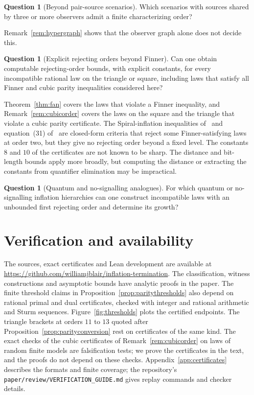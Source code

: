 \documentclass[11pt]{article}
\theoremstyle{plain}
\theoremstyle{definition}
\newtheorem{question}[theorem]{Question}
\newcommand{\repourl}{https://github.com/williamjblair/inflation-termination}
\newcommand{\repo}{\url{\repourl}}
\begin{document}
\begin{question}[Beyond pair-source scenarios]\label{q:hypergraph}
Which scenarios with sources shared by three or more observers admit a finite characterizing order?
\end{question}
Remark~\ref{rem:hypergraph} shows that the observer graph alone does not decide this.

\begin{question}[Explicit rejecting orders beyond Finner]\label{q:effective}
Can one obtain computable rejecting-order bounds, with explicit constants, for every incompatible rational law on the triangle or square, including laws that satisfy all Finner and cubic parity inequalities considered here?
\end{question}
Theorem~\ref{thm:fan} covers the laws that violate a Finner inequality, and Remark~\ref{rem:cubicorder} covers the laws on the square and the triangle that violate a cubic parity certificate. The Spiral-inflation inequalities of~\cite[Section IV C]{WSF2019} and equation~(31) of~\cite{NW2020} are closed-form criteria that reject some Finner-satisfying laws at order two, but they give no rejecting order beyond a fixed level. The constants $8$ and $10$ of the certificates are not known to be sharp. The distance and bit-length bounds apply more broadly, but computing the distance or extracting the constants from quantifier elimination may be impractical.

\begin{question}[Quantum and no-signalling analogues]\label{q:quantum}
For which quantum or no-signalling inflation hierarchies can one construct incompatible laws with an unbounded first rejecting order and determine its growth?
\end{question}

\section{Verification and availability}\label{sec:repro}

The sources, exact certificates and Lean development are available at \repo. The classification, witness constructions and asymptotic bounds have analytic proofs in the paper. The finite threshold claims in Proposition~\ref{prop:paritythresholds} also depend on rational primal and dual certificates, checked with integer and rational arithmetic and Sturm sequences. Figure~\ref{fig:thresholds} plots the certified endpoints. The triangle brackets at orders $11$ to $13$ quoted after Proposition~\ref{prop:parityconversion} rest on certificates of the same kind. The exact checks of the cubic certificates of Remark~\ref{rem:cubicorder} on laws of random finite models are falsification tests; we prove the certificates in the text, and the proofs do not depend on these checks. Appendix~\ref{app:certificates} describes the formats and finite coverage; the repository's \texttt{paper/review/VERIFICATION\_GUIDE.md} gives replay commands and checker details.
\end{document}
